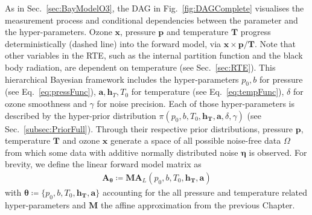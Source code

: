 As in Sec.~\ref{sec:BayModelO3}, the DAG in Fig.~\ref{fig:DAGComplete} visualises the measurement process and conditional dependencies between the parameter and the hyper-parameters.
Ozone $\bm{x}$, pressure $\bm{p}$ and temperature $\bm{T}$ progress deterministically (dashed line) into the forward model, via $\bm{x} \times \bm{p} / \bm{T}$.
Note that other variables in the RTE, such as the internal partition function and the black body radiation, are dependent on temperature (see Sec.~\ref{sec:RTE}).
This hierarchical Bayesian framework includes the hyper-parameters $p_0, b$ for pressure (see Eq.~\ref{eq:pressFunc}), $\bm{a}, \bm{h}_T, T_0$ for temperature (see Eq.~\ref{eq:tempFunc}), $\delta$ for ozone smoothness and $\gamma$ for noise precision.
Each of those hyper-parameters is described by the hyper-prior distribution $\pi(p_0,b,T_0,\bm{h_T},\bm{a}, \delta,\gamma)$ (see Sec.~\ref{subsec:PriorFull}).
Through their respective prior distributions, pressure $\bm{p}$, temperature $\bm{T}$ and ozone $\bm{x}$ generate a space of all possible noise-free data $\Omega$ from which some data with additive normally distributed noise $\bm{\eta}$ is observed.
For brevity, we define the linear forward model matrix as
\begin{align}
	\bm{A}_{\bm{\theta}} \coloneqq \bm{M}\bm{A}_L(p_0,b,T_0,\bm{h_T},\bm{a}) 
\end{align}
with $\bm{\theta}  \coloneqq \{p_0,b,T_0,\bm{h_T},\bm{a}  \}$ accounting for the all pressure and temperature related hyper-parameters and $\bm{M}$ the affine approximation from the previous Chapter.

